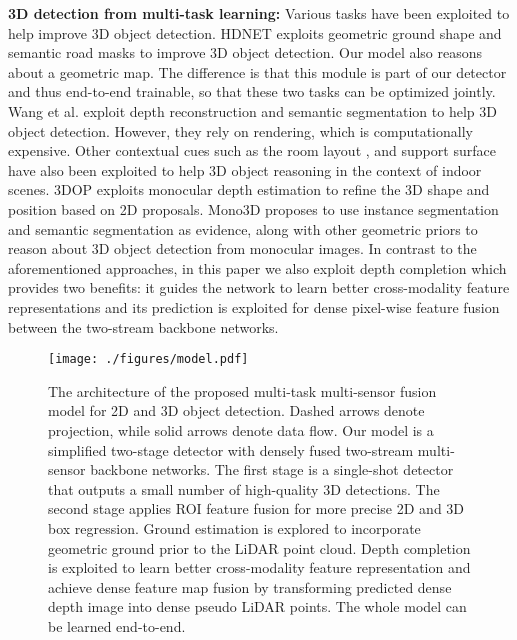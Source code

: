 \documentclass[10pt,twocolumn,letterpaper]{article}
\newcommand{\bd}[1]{\textbf{#1}}
\begin{document}
\newline
\newline
\bd{3D detection from multi-task learning:}
Various tasks  have been exploited to help improve 3D object detection. HDNET \cite{hdnet} exploits geometric ground shape and semantic road masks to improve 3D object detection. 
Our model also reasons about a geometric map. The difference is that this module is part of our detector and  thus end-to-end trainable, so that these two tasks can be optimized jointly. Wang et al. \cite{holistic} exploit depth reconstruction and semantic segmentation to help 3D object detection. However, they  rely on rendering, which  is computationally expensive. Other contextual cues such as the room layout \cite{rencvpr16, schwing2013box}, and support surface \cite{rencvpr18} have  also been exploited to help 3D object reasoning in the context of indoor scenes.
3DOP \cite{3dop} exploits monocular depth estimation to refine the 3D shape and position based on 2D proposals. Mono3D \cite{mono3d} proposes to use instance segmentation and semantic segmentation as evidence, along with other geometric priors to reason about 3D object detection from monocular images. 
In  contrast to the aforementioned approaches, in this paper we also exploit depth completion  which provides two benefits: it guides the network to learn better cross-modality feature representations  and its prediction is exploited for dense pixel-wise feature fusion between the two-stream backbone networks.
 \begin{figure*}[t]
\begin{center}
 \texttt{[image: ./figures/model.pdf]}
\end{center}
   \caption{The architecture of the proposed multi-task multi-sensor fusion model for 2D and 3D object detection. Dashed arrows denote projection, while solid arrows denote data flow. Our model is a simplified two-stage detector with densely fused two-stream multi-sensor backbone networks. The first stage is a single-shot detector that outputs a small number of high-quality 3D detections. The second stage applies ROI feature fusion for more precise 2D and 3D box regression. Ground estimation is explored to incorporate geometric ground prior to the LiDAR point cloud. Depth completion is exploited to learn better cross-modality feature representation and achieve dense feature map fusion by transforming predicted dense depth image into dense pseudo LiDAR points. The whole model can be learned end-to-end.}
\label{fig:model}
\end{figure*}
\end{document}
